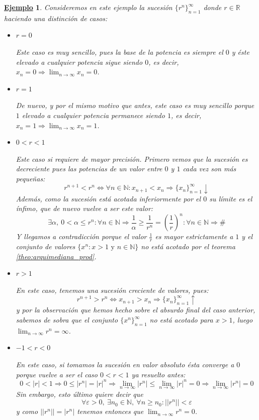 \documentclass[10pt,a4paper,openright]{book}
\theoremstyle{break}
\newtheorem{ej}{\underline{Ejemplo}}[chapter]
\begin{document}
\begin{ej}
Consideremos en este ejemplo la sucesión $\{r^n\}_{n=1}^\infty$ donde $r\in \mathbb R$ haciendo una distinción de casos:
\begin{itemize}
\item $r=0$

Este caso es muy sencillo, pues la base de la potencia es siempre el $0$ y éste elevado a cualquier potencia sigue siendo $0$, es decir, $x_n=0\Rightarrow \lim_{n\rightarrow \infty}x_n=0$.

\item $r=1$

De nuevo, y por el mismo motivo que antes, este caso es muy sencillo porque $1$ elevado a cualquier potencia permanece siendo $1$, es decir, $x_n=1\Rightarrow \lim_{n\rightarrow \infty}x_n=1$.

\item $0<r<1$

Este caso si requiere de mayor precisión. Primero vemos que la sucesión es decreciente pues las potencias de un valor entre $0$ y $1$ cada vez son más pequeñas:
\[
r^{n+1} < r^n \Leftrightarrow \forall n \in \mathbb{N} : x_{n+1} < x_n \Rightarrow \{x_n\}_{n=1}^\infty \downarrow
\]
Además, como la sucesión está acotada inferiormente por el $0$ su límite es el ínfimo, que de nuevo vuelve a ser este valor:
\[
\exists\alpha, \ 0 < \alpha \leq r^n : \forall n\in \mathbb N \Rightarrow \frac{1}{\alpha}\geq \frac{1}{r^n} = \left(\frac{1}{r}\right)^n : \forall n\in \mathbb N \Rightarrow \# 
\]
Y llegamos a contradicción porque el valor $\frac{1}{r}$ es mayor estrictamente a $1$ y el conjunto de valores $\{x^n: x>1 \mbox{ y } n\in \mathbb N\}$ no está acotado por el teorema \ref{theo:arquimediana_prod}.

\item $r>1$

En este caso, tenemos una sucesión creciente de valores, pues:
\[
r^{n+1} > r^n \Leftrightarrow x_{n+1} > x_n \Rightarrow \{x_n\}_{n=1}^\infty \uparrow
\]
y por la observación que hemos hecho sobre el absurdo final del caso anterior, sabemos de sobra que el conjunto $\{x^n\}_{n=1}^\infty$ no está acotado para $x>1$, luego $\lim_{n\rightarrow\infty} r^n = \infty$.

\item $-1<r<0$

En este caso, si tomamos la sucesión en valor absoluto ésta converge a $0$ porque vuelve a ser el caso $0<r<1$ ya resuelto antes:
\[
0 < |r| < 1 \Rightarrow 0 \leq |r^n| = |r|^n \Rightarrow \lim_{n\rightarrow \infty} |r^n| \leq \lim_{n\rightarrow \infty} |r|^n = 0 \Rightarrow \lim_{n\rightarrow \infty} |r^n| = 0
\]
Sin embargo, esto último quiere decir que
\[
\forall \varepsilon > 0, \ \exists n_0\in \mathbb{N}, \ \forall n\geq n_0 : ||r^n|| < \varepsilon
\]
y como $||r^n|| = |r^n|$ tenemos entonces que $\lim_{n\rightarrow\infty} r^n = 0$.


\end{itemize}
\end{ej}
\end{document}
